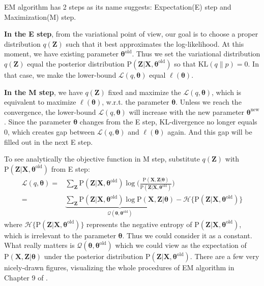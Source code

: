 EM algorithm has 2 steps as its name suggests: Expectation(E) step and Maximization(M) step.

\textbf{In the E step}, from the variational point of view, our goal is to choose a proper distribution $q(\mathbf{Z})$ such that it best approximates the log-likelihood. At this moment, we have existing parameter $\boldsymbol{\theta}^{\text{old}}$.
Thus we set the variational distribution $q(\mathbf{Z})$ equal the posterior distribution $\mathrm{P}(\mathbf{Z}|\mathbf{X}, \boldsymbol{\theta}^{\text{old}})$ so that $\text{KL}(q\|p) = 0$. In that case, we make the lower-bound $\mathcal{L}(q, {\boldsymbol{\theta}})$ equal $\ell(\boldsymbol{\theta})$.

\textbf{In the M step}, we have $q(\mathbf{Z})$ fixed and maximize the $\mathcal{L}(q, \boldsymbol{\theta})$, which is equivalent to maximize $\ell(\boldsymbol{\theta})$,  w.r.t. the parameter $\boldsymbol{\theta}$. Unless we reach the convergence, the lower-bound $\mathcal{L}(q, \boldsymbol{\theta})$ will increase with the new parameter $\boldsymbol{\theta}^{\text{new}}$. Since the parameter $\boldsymbol{\theta}$ changes from the E step, KL-divergence no longer equals 0, which creates gap between $\mathcal{L}(q, \boldsymbol{\theta})$ and $\ell(\boldsymbol{\theta})$ again. And this gap will be filled out in the next E step.

To see analytically the objective function in M step, substitute $q(\mathbf{Z})$ with $\mathrm{P}(\mathbf{Z}|\mathbf{X}, \boldsymbol{\theta}^{\text{old}})$ from E step:
\begin{align*}
\mathcal{L}(q, \boldsymbol{\theta}) =& \sum_{\mathbf{Z}}\mathrm{P}(\mathbf{Z}|\mathbf{X}, \boldsymbol{\theta}^{\text{old}}) \log\Big(\frac{\mathrm{P}(\mathbf{X, Z}|\boldsymbol{\theta})}{\mathrm{P}(\mathbf{Z}|\mathbf{X}, \boldsymbol{\theta}^{\text{old}})}\Big) \\
=& \underbrace{\sum_{\mathbf{Z}}\mathrm{P}(\mathbf{Z}|\mathbf{X}, \boldsymbol{\theta}^{\text{old}}) \log\mathrm{P}(\mathbf{X, Z}|\boldsymbol{\theta})}_{\mathcal{Q}(\boldsymbol{\theta}, \boldsymbol{\theta}^{\text{old}})} - \mathcal{H}\{\mathrm{P}(\mathbf{Z|X},\boldsymbol{\theta}^{\text{old}})\}
\end{align*} 
where $\mathcal{H}\{\mathrm{P}(\mathbf{Z|X},\boldsymbol{\theta}^{\text{old}})\}$ represents the negative entropy of $\mathrm{P}(\mathbf{Z|X},\boldsymbol{\theta}^{\text{old}})$, which is irrelevant to the parameter $\boldsymbol{\theta}$. Thus we could consider it as a constant. What really matters is $\mathcal{Q}(\boldsymbol{\theta}, \boldsymbol{\theta}^{\text{old}})$ which we could view as the expectation of $\mathrm{P}(\mathbf{X, Z}|\boldsymbol{\theta})$ under the posterior distribution $\mathrm{P}(\mathbf{Z}|\mathbf{X}, \boldsymbol{\theta}^{\text{old}})$. There are a few very nicely-drawn figures, visualizing the whole procedures of EM algorithm in Chapter 9 of \cite{Bishop:2006:PRM:1162264}. 

